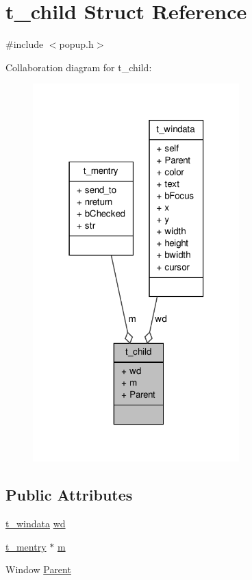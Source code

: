 \hypertarget{structt__child}{\section{t\-\_\-child \-Struct \-Reference}
\label{structt__child}
}


{\ttfamily \#include $<$popup.\-h$>$}



\-Collaboration diagram for t\-\_\-child\-:
\nopagebreak
\begin{figure}[H]
\begin{center}
\leavevmode
\includegraphics[width=226pt]{structt__child__coll__graph}
\end{center}
\end{figure}
\subsection*{\-Public \-Attributes}
\begin{DoxyCompactItemize}
\item 
\hyperlink{structt__windata}{t\-\_\-windata} \hyperlink{structt__child_a5beda9f3b6a10a0cc77ce00aef3370ea}{wd}
\item 
\hyperlink{structt__mentry}{t\-\_\-mentry} $\ast$ \hyperlink{structt__child_a9ac6db48a671f0ae695e127db6ecd48c}{m}
\item 
\-Window \hyperlink{structt__child_a579c755a1dd897de157938a64a8db701}{\-Parent}
\end{DoxyCompactItemize}


